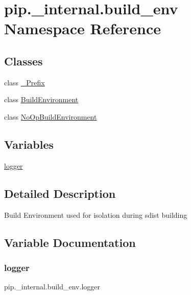 \hypertarget{namespacepip_1_1__internal_1_1build__env}{}\section{pip.\+\_\+internal.\+build\+\_\+env Namespace Reference}
\label{namespacepip_1_1__internal_1_1build__env}
\subsection*{Classes}
\begin{DoxyCompactItemize}
\item 
class \hyperlink{classpip_1_1__internal_1_1build__env_1_1__Prefix}{\+\_\+\+Prefix}
\item 
class \hyperlink{classpip_1_1__internal_1_1build__env_1_1BuildEnvironment}{Build\+Environment}
\item 
class \hyperlink{classpip_1_1__internal_1_1build__env_1_1NoOpBuildEnvironment}{No\+Op\+Build\+Environment}
\end{DoxyCompactItemize}
\subsection*{Variables}
\begin{DoxyCompactItemize}
\item 
\hyperlink{namespacepip_1_1__internal_1_1build__env_aae2dc16c5b17802b287cd03d2af818d5}{logger}
\end{DoxyCompactItemize}


\subsection{Detailed Description}
\begin{DoxyVerb}Build Environment used for isolation during sdist building
\end{DoxyVerb}
 

\subsection{Variable Documentation}
\mbox{\label{namespacepip_1_1__internal_1_1build__env_aae2dc16c5b17802b287cd03d2af818d5}} 
\subsubsection{\texorpdfstring{logger}{logger}}
{\footnotesize\ttfamily pip.\+\_\+internal.\+build\+\_\+env.\+logger}

